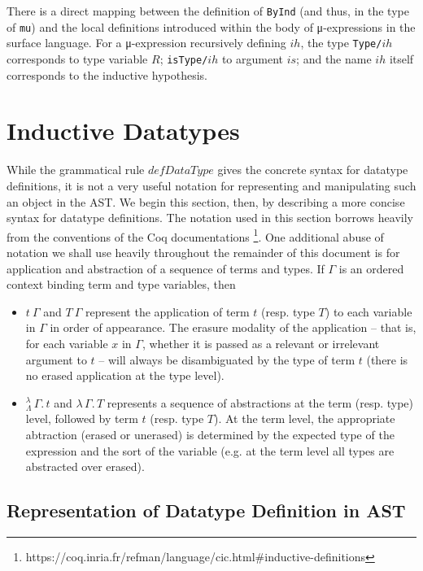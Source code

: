 \documentclass{article}
\newcommand{\absu}[3]{{#1}\, #2.\, #3}
\newcommand{\lamLam}{^{\lambda}_{\Lambda}}
\begin{document}
There is a direct mapping between the definition of \texttt{ByInd} (and thus, in
the type of \texttt{mu}) and the local definitions introduced within the body of
μ-expressions in the surface language. For a μ-expression recursively defining
$ih$, the type \texttt{Type/}$ih$ corresponds to type variable
$R$; \texttt{isType/}$ih$ to argument $is$; and the name $ih$
itself corresponds to the inductive hypothesis.


\newpage
\section{Inductive Datatypes}
\label{sec:ind-data}

While the grammatical rule $defDataType$ gives the concrete syntax for datatype
definitions, it is not a very useful notation for representing and manipulating
such an object in the AST. We begin this section, then, by describing a more
concise syntax for datatype definitions. The notation used in this section
borrows heavily from the conventions of the Coq documentations
\footnote{https://coq.inria.fr/refman/language/cic.html\#inductive-definitions}.
One additional abuse of notation we shall use heavily throughout the remainder
of this document is for application and abstraction of a sequence of terms and
types. If $\Gamma$ is an ordered context binding term and type variables, then

\begin{itemize}
\item $t\ \Gamma$ and $T\ \Gamma$ represent the application of term $t$ (resp.
  type $T$) to each variable in $\Gamma$ in order of appearance. The erasure
  modality of the application -- that is, for each variable $x$ in $\Gamma$,
  whether it is passed as a relevant or irrelevant argument to $t$ -- will
  always be disambiguated by the type of term $t$ (there is no erased
  application at the type level).
\item $\absu{\lamLam}{\Gamma}{t}$ and $\absu{\lambda}{\Gamma}{T}$ represents a
  sequence of abstractions at the term (resp. type) level, followed by term $t$
  (resp. type $T$). At the term level, the appropriate abtraction (erased or
  unerased) is determined by the expected type of the expression and the sort
  of the variable (e.g. at the term level all types are abstracted over erased).
\end{itemize}

\subsection{Representation of Datatype Definition in AST}
\end{document}
